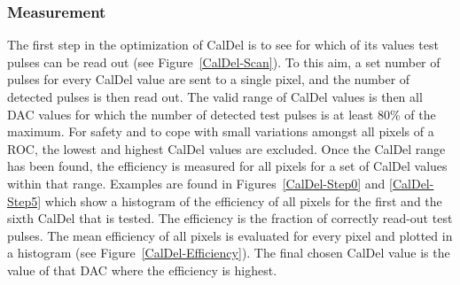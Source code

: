 \documentclass[a4paper,12pt,twoside]{article}
\begin{document}
\subsubsection{Measurement}
The first step in the optimization of CalDel is to see for which of its values test pulses can be read out (see Figure~\ref{CalDel-Scan}). To this aim, a set number of pulses for every CalDel value are sent to a single pixel, and the number of detected pulses is then read out. The valid range of CalDel values is then all DAC values for which the number of detected test pulses is at least 80\% of the maximum. For safety and to cope with small variations amongst all pixels of a ROC, the lowest and highest CalDel values are excluded. Once the CalDel range has been found, the efficiency is measured for all pixels for a set of CalDel values within that range. Examples are found in Figures~\ref{CalDel-Step0} and \ref{CalDel-Step5} which show a histogram of the efficiency of all pixels for the first and the sixth CalDel that is tested. The efficiency is the fraction of correctly read-out test pulses. The mean efficiency of all pixels is evaluated for every pixel and plotted in a histogram (see Figure~\ref{CalDel-Efficiency}). The final chosen CalDel value is the value of that DAC where the efficiency is highest.
\end{document}
